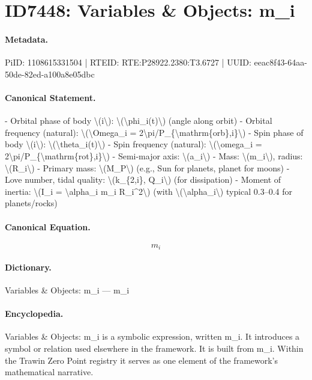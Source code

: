 \section*{ID7448: Variables \& Objects: m\_i}
\paragraph{Metadata.}
PiID: 1108615331504 | RTEID: RTE:P28922.2380:T3.6727 | UUID: eeac8f43-64aa-50de-82ed-a100a8e05dbc

\paragraph{Canonical Statement.}
- Orbital phase of body \textbackslash{}(i\textbackslash{}): \textbackslash{}(\textbackslash{}phi\_i(t)\textbackslash{}) (angle along orbit) - Orbital frequency (natural): \textbackslash{}(\textbackslash{}Omega\_i = 2\textbackslash{}pi/P\_\{\textbackslash{}mathrm\{orb\},i\}\textbackslash{}) - Spin phase of body \textbackslash{}(i\textbackslash{}): \textbackslash{}(\textbackslash{}theta\_i(t)\textbackslash{}) - Spin frequency (natural): \textbackslash{}(\textbackslash{}omega\_i = 2\textbackslash{}pi/P\_\{\textbackslash{}mathrm\{rot\},i\}\textbackslash{}) - Semi-major axis: \textbackslash{}(a\_i\textbackslash{}) - Mass: \textbackslash{}(m\_i\textbackslash{}), radius: \textbackslash{}(R\_i\textbackslash{}) - Primary mass: \textbackslash{}(M\_P\textbackslash{}) (e.g., Sun for planets, planet for moons) - Love number, tidal quality: \textbackslash{}(k\_\{2,i\}, Q\_i\textbackslash{}) (for dissipation) - Moment of inertia: \textbackslash{}(I\_i = \textbackslash{}alpha\_i m\_i R\_i\textasciicircum{}2\textbackslash{}) (with \textbackslash{}(\textbackslash{}alpha\_i\textbackslash{}) typical 0.3–0.4 for planets/rocks)

\paragraph{Canonical Equation.}
\[
m_i
\]

\paragraph{Dictionary.}
Variables \& Objects: m\_i — m\_i

\paragraph{Encyclopedia.}
Variables \& Objects: m\_i is a symbolic expression, written m\_i. It introduces a symbol or relation used elsewhere in the framework. It is built from m\_i. Within the Trawin Zero Point registry it serves as one element of the framework's mathematical narrative.
